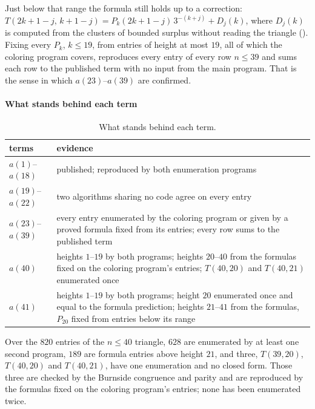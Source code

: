 \documentclass[11pt]{article}
\begin{document}
Just below that range the formula still holds up to a correction:
$T(2k+1-j,\,k+1-j) = P_k(2k+1-j)\,3^{-(k+j)} + D_j(k)$, where $D_j(k)$ is
computed from the clusters of bounded surplus without reading the triangle
(). Fixing every $P_k$, $k \le 19$, from entries of
height at most $19$, all of which the coloring program covers, reproduces
every entry of every row $n \le 39$ and sums each row to the published term
with no input from the main program. That is the sense in which
$a(23)$--$a(39)$ are confirmed.

\paragraph{What stands behind each term}

\begin{table}[H]
\centering\small
\begin{tabular}{l R{0.72\textwidth}}
\toprule
terms & evidence \\
\midrule
$a(1)$--$a(18)$ & published; reproduced by both enumeration programs \\
$a(19)$--$a(22)$ & two algorithms sharing no code agree on every entry \\
$a(23)$--$a(39)$ & every entry enumerated by the coloring program or given by a
  proved formula fixed from its entries; every row sums to the published
  term \\
$a(40)$ & heights $1$--$19$ by both programs; heights $20$--$40$ from the
  formulas fixed on the coloring program's entries; $T(40,20)$ and $T(40,21)$
  enumerated once \\
$a(41)$ & heights $1$--$19$ by both programs; height $20$ enumerated once and
  equal to the formula prediction; heights $21$--$41$ from the formulas,
  $P_{20}$ fixed from entries below its range \\
\bottomrule
\end{tabular}
\caption{What stands behind each term.}
\label{tab:tiers}
\end{table}

Over the $820$ entries of the $n \le 40$ triangle, $628$ are enumerated by at
least one second program, $189$ are formula entries above height $21$, and
three, $T(39,20)$, $T(40,20)$ and $T(40,21)$, have one enumeration and no
closed form. Those three are checked by the Burnside congruence and parity
and are reproduced by the formulas fixed on the coloring program's entries;
none has been enumerated twice.
\end{document}
